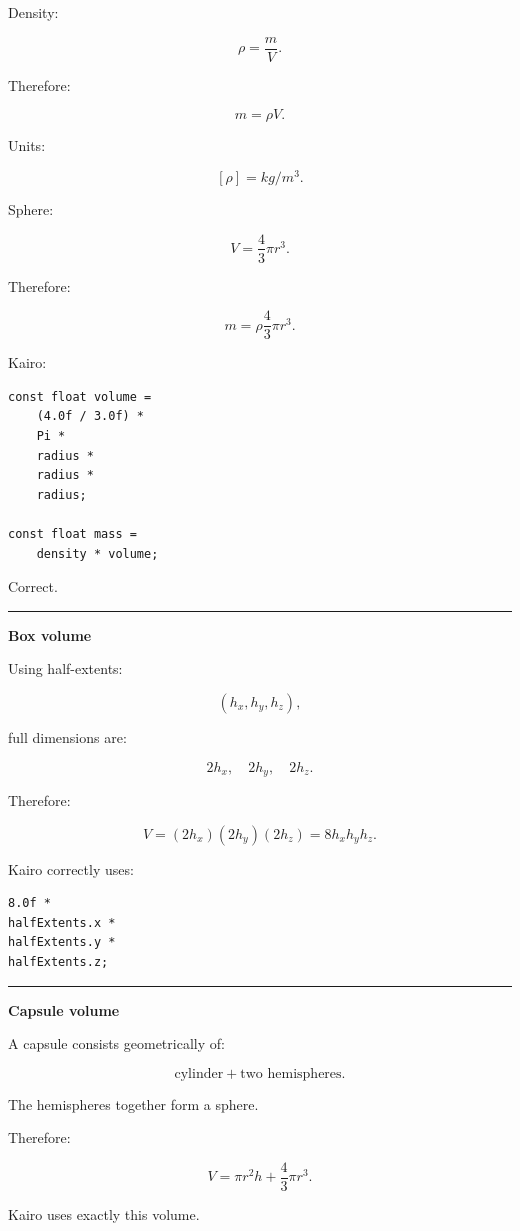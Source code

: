 Density:

\[
\rho
=
\frac{m}{V}.
\]

Therefore:

\[
\boxed{
m=\rho V.
}
\]

Units:

\[
[\rho]
=
kg/m^3.
\]

Sphere:

\[
V=
\frac{4}{3}\pi r^3.
\]

Therefore:

\[
m=
\rho
\frac{4}{3}\pi r^3.
\]

Kairo:

\begin{verbatim}
const float volume =
    (4.0f / 3.0f) *
    Pi *
    radius *
    radius *
    radius;

const float mass =
    density * volume;
\end{verbatim}

Correct.

\begin{center}\rule{0.5\linewidth}{0.5pt}\end{center}

\textbf{Box volume}

Using half-extents:

\[
(h_x,h_y,h_z),
\]

full dimensions are:

\[
2h_x,\quad2h_y,\quad2h_z.
\]

Therefore:

\[
V=
(2h_x)(2h_y)(2h_z)
=
8h_xh_yh_z.
\]

Kairo correctly uses:

\begin{verbatim}
8.0f *
halfExtents.x *
halfExtents.y *
halfExtents.z;
\end{verbatim}

\begin{center}\rule{0.5\linewidth}{0.5pt}\end{center}

\textbf{Capsule volume}

A capsule consists geometrically of:

\[
\text{cylinder}
+
\text{two hemispheres}.
\]

The hemispheres together form a sphere.

Therefore:

\[
V
=
\pi r^2h
+
\frac{4}{3}\pi r^3.
\]

Kairo uses exactly this volume.

